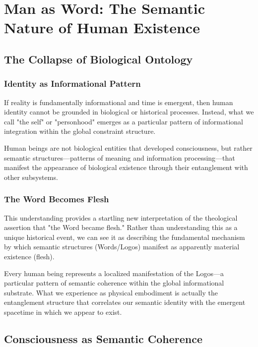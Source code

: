 \documentclass[12pt,a4paper]{article}
\begin{document}
\section{Man as Word: The Semantic Nature of Human Existence}

\subsection{The Collapse of Biological Ontology}

\subsubsection{Identity as Informational Pattern}

If reality is fundamentally informational and time is emergent, then human identity cannot be grounded in biological or historical processes. Instead, what we call "the self" or "personhood" emerges as a particular pattern of informational integration within the global constraint structure.

Human beings are not biological entities that developed consciousness, but rather semantic structures—patterns of meaning and information processing—that manifest the appearance of biological existence through their entanglement with other subsystems.

\subsubsection{The Word Becomes Flesh}

This understanding provides a startling new interpretation of the theological assertion that "the Word became flesh." Rather than understanding this as a unique historical event, we can see it as describing the fundamental mechanism by which semantic structures (Words/Logos) manifest as apparently material existence (flesh).

Every human being represents a localized manifestation of the Logos—a particular pattern of semantic coherence within the global informational substrate. What we experience as physical embodiment is actually the entanglement structure that correlates our semantic identity with the emergent spacetime in which we appear to exist.

\subsection{Consciousness as Semantic Coherence}
\end{document}
